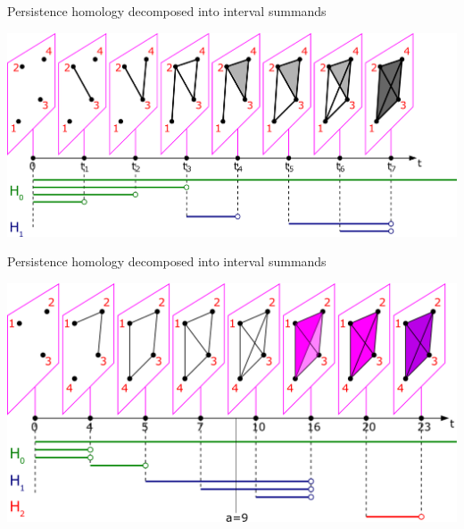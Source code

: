 \documentclass[10pt,xcolor={usenames}]{beamer}
\newcommand{\ko}{\Bbbk}
\newcommand{\Zo}{\mathbb{Z}}
\begin{document}
\begin{frame}{Persistence homology decomposed into interval summands}

\begin{center}
\includegraphics[scale=0.2]{pictures/filtration1.pdf}
\end{center}

\end{frame}

\begin{frame}{Persistence homology decomposed into interval summands}

\begin{center}
\includegraphics[scale=0.2]{pictures/filtration2.pdf}
\end{center}

\end{frame}

%
%
%
%
%
%
\end{document}

